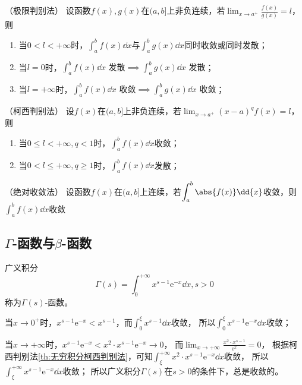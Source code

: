 \begin{theorem}
    （极限判别法）
    \label{th:瑕积分极限判别法}
    设函数$f(x),g(x)$在$(a,b]$上非负连续，若$\displaystyle\lim_{x\to a^+}\frac{f(x)}{g(x)}=l$，则
    \begin{enumerate}[(1)]
        \item 当$0<l<+\infty$时，$\displaystyle\int_a^bf(x)\dd{x}\text{与}\int_a^bg(x)\dd{x}$同时收敛或同时发散；
        \item 当$l=0$时，$\displaystyle\int_a^bf(x)\dd{x}\text{ 发散}\implies\int_a^bg(x)\dd{x}\text{ 发散}$；
        \item 当$l=+\infty$时，$\displaystyle\int_a^bf(x)\dd{x}\text{ 收敛}\implies\int_a^bg(x)\dd{x}\text{ 收敛}$；
    \end{enumerate}
\end{theorem}

\begin{theorem}
    （柯西判别法）
    \label{th:瑕积分柯西判别法}
    设$f(x)$在$(a,b]$上非负连续，若$\displaystyle\lim_{x\to a^+}(x-a)^qf(x)=l$，则
    \begin{enumerate}[(1)]
        \item 当$0\leq l < +\infty,q<1$时，$\displaystyle\int_a^bf(x)\dd{x}$收敛；
        \item 当$0< l \leq +\infty,q\geq 1$时，$\displaystyle\int_a^bf(x)\dd{x}$发散；
    \end{enumerate}
\end{theorem}

\begin{theorem}
    （绝对收敛法）
    \label{th:瑕积分绝对收敛法}
    设函数$f(x)$在$(a,b]$上连续，若$\displaystyle\int_a^b\abs{f(x)}\dd{x}$收敛，则$\displaystyle\int_a^bf(x)\dd{x}$收敛
\end{theorem}

\subsection{\texorpdfstring{$\Gamma$-函数与$\beta$-函数}{Γ-函数与β-函数}}
广义积分
\[ \Gamma(s) = \int_0^{+\infty}x^{s-1}\mathrm{e}^{-x}\dd{x}, s> 0 \]
称为$\Gamma(s)$-函数。

当$x\to 0^+$时，$x^{s-1}\mathrm{e}^{-x} < x^{s-1}$，而$\displaystyle \int_0^\xi x^{s-1}\dd{x}$收敛，
所以$\displaystyle \int_0^\xi x^{s-1}\mathrm{e}^{-x}\dd{x}$收敛；

当$x\to+\infty$时，$x^{s-1}\mathrm{e}^{-x} < x^2\cdot x^{s-1}\mathrm{e}^{-x} \to 0$，
而$\displaystyle\lim_{x\to+\infty}\frac{x^2\cdot x^{s-1}}{\mathrm{e}^x} = 0$，
根据柯西判别法\ref{th:无穷积分柯西判别法}，可知$\displaystyle \int_\xi^{+\infty} x^2\cdot x^{s-1}\mathrm{e}^{-x}\dd{x}$收敛，
所以$\displaystyle \int_\xi^{+\infty} x^{s-1}\mathrm{e}^{-x}\dd{x}$收敛；
所以广义积分$\Gamma(s)$在$s>0$的条件下，总是收敛的。

